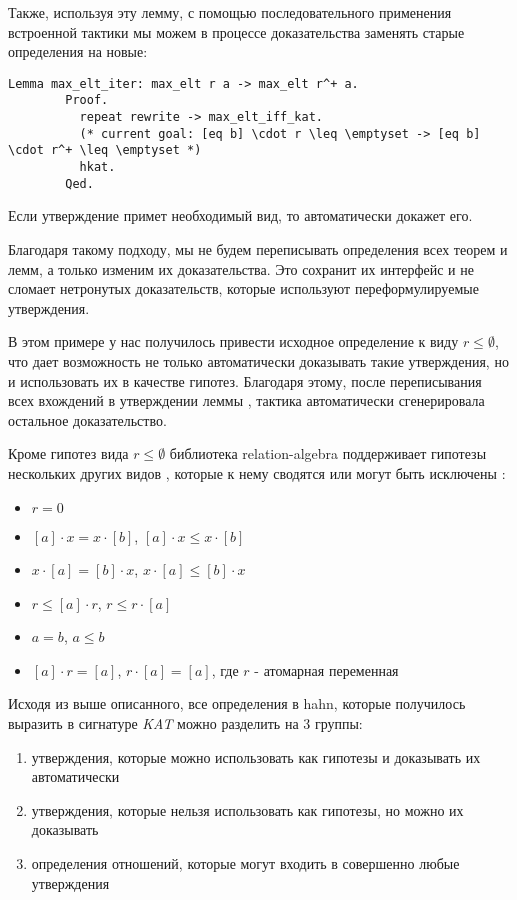 \documentclass[times
              ,specification
              ,annotation
              ]{itmo-student-thesis}
\begin{document}
      Также, используя эту лемму, с помощью последовательного применения встроенной тактики
       мы можем в процессе доказательства заменять старые определения на новые: 

      \begin{lstlisting}[gobble=8]
        Lemma max_elt_iter: max_elt r a -> max_elt r^+ a.
        Proof.
          repeat rewrite -> max_elt_iff_kat.
          (* current goal: [eq b] \cdot r \leq \emptyset -> [eq b] \cdot r^+ \leq \emptyset *)
          hkat.
        Qed.
      \end{lstlisting}

      Если утверждение примет необходимый вид, то  автоматически докажет его.
      
      Благодаря такому подходу, мы не будем переписывать определения всех теорем и лемм, а только изменим их доказательства.
      Это сохранит их интерфейс и не сломает нетронутых доказательств, которые используют переформулируемые утверждения.

      В этом примере у нас получилось привести исходное определение  к виду $r \leq \emptyset$, что
      дает возможность не только автоматически доказывать такие утверждения, но и использовать
      их в качестве гипотез.
      Благодаря этому, после переписывания всех вхождений  в утверждении леммы
      , тактика  автоматически сгенерировала остальное доказательство.

      Кроме гипотез вида $r \leq \emptyset$ библиотека relation-algebra поддерживает гипотезы нескольких других
      видов \cite{kat}, которые к нему сводятся или могут быть исключены \cite{hkat,hkat_cpc}:
      \begin{itemize}
        \item $ r = 0 $
        \item $[a] \cdot x = x \cdot [b]$, $[a] \cdot x \leq x \cdot [b]$
        \item $x \cdot [a] = [b] \cdot x$, $x \cdot [a] \leq [b] \cdot x$
        \item $ r \leq [a] \cdot r $, $ r \leq r \cdot [a]$
        \item $ a = b $, $ a \leq b $
        \item $[a] \cdot r = [a]$, $r \cdot [a] = [a]$, где $r$ - атомарная переменная
      \end{itemize}

      Исходя из выше описанного, все определения в hahn, которые получилось выразить в сигнатуре
      \textit{KAT} можно разделить на 3 группы:
      \begin{enumerate}
        \item утверждения, которые можно использовать как гипотезы и доказывать их автоматически
        \item утверждения, которые нельзя использовать как гипотезы, но можно их доказывать
        \item определения отношений, которые могут входить в совершенно любые утверждения
      \end{enumerate}
\end{document}
